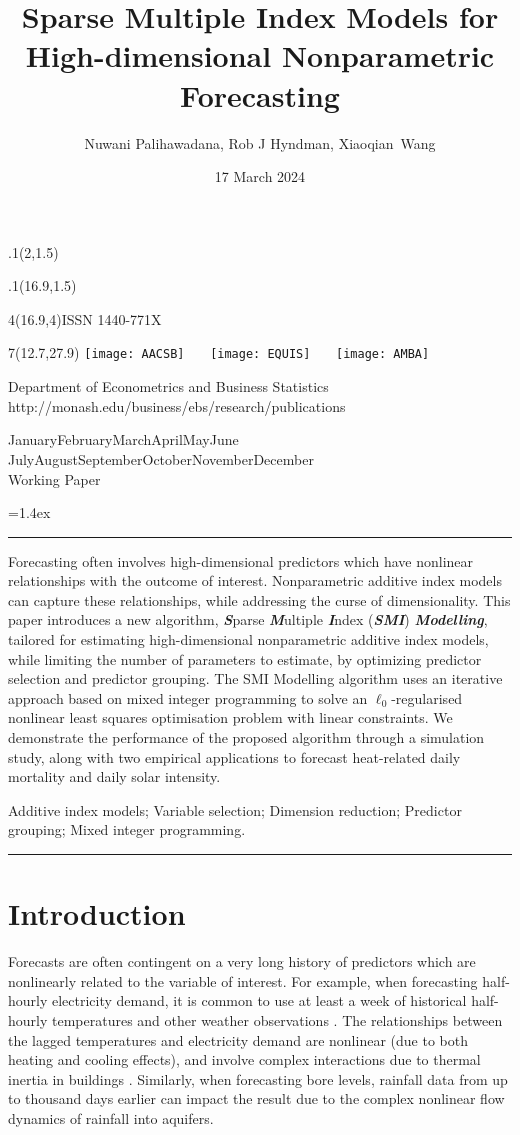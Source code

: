 \documentclass[
  11pt,
  a4paper,
]{article}
\title{Sparse Multiple Index Models for High-dimensional Nonparametric
Forecasting}
\date{17 March 2024}
\author{Nuwani Palihawadana, Rob J Hyndman, Xiaoqian~Wang}
\makeatletter
\def\placefig#1#2#3#4{\begin{textblock}{.1}(#1,#2)\rlap{\texttt{[image: \#4]}}\end{textblock}}
\def\Date{\number\day}
\def\Month{\ifcase\month\or
 January\or February\or March\or April\or May\or June\or
 July\or August\or September\or October\or November\or December\fi}
\def\Year{\number\year}
\def\showjel{{\large\textsf{\textbf{JEL classification:}}~\@jel}}
\def\cover{{\sffamily\setcounter{page}{0}
        \thispagestyle{empty}
        \placefig{2}{1.5}{width=5cm}{monash2}
        \placefig{16.9}{1.5}{width=2.1cm}{MBSportrait}
        \begin{textblock}{4}(16.9,4)ISSN 1440-771X\end{textblock}
        \begin{textblock}{7}(12.7,27.9)\hfill
        \texttt{[image: AACSB]}~~~
        \texttt{[image: EQUIS]}~~~
        \texttt{[image: AMBA]}
        \end{textblock}
        \vspace*{2.5cm}
        \begin{center}\Large
        Department of Econometrics and Business Statistics\\[.5cm]
        \footnotesize http://monash.edu/business/ebs/research/publications
        \end{center}\vspace{2cm}
        \begin{center}
        \fbox{\parbox{14cm}{\begin{onehalfspace}\centering\Huge\vspace*{0.3cm}
                \textsf{\textbf{\expandafter{\@title}}}\vspace{1cm}\par
                \LARGE
                \expandafter{\@author}
                \end{onehalfspace}
        }}
        \end{center}
        \vfill
                \begin{center}\Large
                \Month~\Year\\[1cm]
                Working Paper \@wp
        \end{center}\vspace*{2cm}}}
\def\pageone{{\sffamily\setstretch{1}%
        \thispagestyle{empty}%
        \vbox to \textheight{%
        \raggedright\baselineskip=1.2cm
     {\fontsize{24.88}{30}\sffamily\textbf{\expandafter{\@title}}}
        \vspace{2cm}\par
        \hspace{1cm}\parbox{14cm}{\sffamily\large\@addresses}\vspace{1cm}\vfill
        \hspace{1cm}{\large\Date~\Month~\Year}\\[1cm]
        \hspace{1cm}\showjel\vss}}}
\def\blindtitle{{\sffamily
     \thispagestyle{plain}\raggedright\baselineskip=1.2cm
     {\fontsize{24.88}{30}\sffamily\textbf{\expandafter{\@title}}}\vspace{1cm}\par
        }}
\def\titlepage{{\cover\newpage\pageone\newpage\blindtitle}}
\let\maketitle\titlepage
\newenvironment{keywords}{\par\vspace{0.5cm}\noindent{\sffamily\textbf{Keywords:}}}{\vspace{0.25cm}\par\hrule\vspace{0.5cm}\par}
\renewenvironment{abstract}{\begin{minipage}{\textwidth}\parskip=1.4ex\noindent
\hrule\vspace{0.1cm}\par{\sffamily\textbf{\abstractname}}\newline\setstretch{1.5}}
  {\end{minipage}}
\makeatother
\begin{document}
\maketitle

\begin{abstract}
Forecasting often involves high-dimensional predictors which have
nonlinear relationships with the outcome of interest. Nonparametric
additive index models can capture these relationships, while addressing
the curse of dimensionality. This paper introduces a new algorithm,
\textbf{\emph{S}}parse \textbf{\emph{M}}ultiple \textbf{\emph{I}}ndex
(\textbf{\emph{SMI}}) \textbf{\emph{Modelling}}, tailored for estimating
high-dimensional nonparametric additive index models, while limiting the
number of parameters to estimate, by optimizing predictor selection and
predictor grouping. The SMI Modelling algorithm uses an iterative
approach based on mixed integer programming to solve an
\(\ell_{0}\)-regularised nonlinear least squares optimisation problem
with linear constraints. We demonstrate the performance of the proposed
algorithm through a simulation study, along with two empirical
applications to forecast heat-related daily mortality and daily solar
intensity.
\end{abstract}

\begin{keywords}
  Additive index models; Variable selection; Dimension
reduction; Predictor grouping; 
  Mixed integer programming.
\end{keywords}

\section{Introduction}\label{sec-introduction}

Forecasts are often contingent on a very long history of predictors
which are nonlinearly related to the variable of interest. For example,
when forecasting half-hourly electricity demand, it is common to use at
least a week of historical half-hourly temperatures and other weather
observations \autocite{HF2010}. The relationships between the lagged
temperatures and electricity demand are nonlinear (due to both heating
and cooling effects), and involve complex interactions due to thermal
inertia in buildings \autocite{FH2012}. Similarly, when forecasting bore
levels, rainfall data from up to thousand days earlier can impact the
result \autocite{Peterson2014,Bakker2019,Rajaee2019} due to the complex
nonlinear flow dynamics of rainfall into aquifers.
\end{document}
